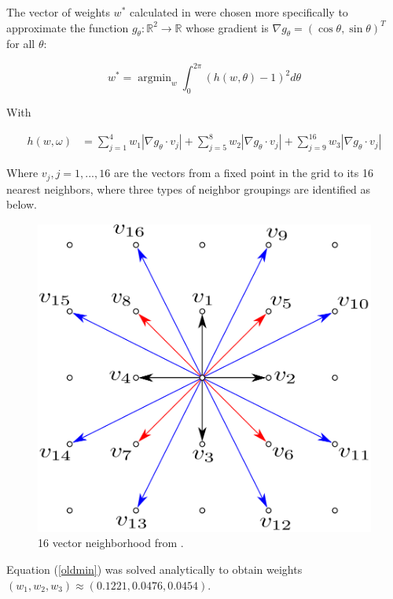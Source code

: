\documentclass[12pt]{article}
\DeclareMathOperator*{\argmin}{argmin}
\begin{document}
The vector of weights $w^*$ calculated in \cite{shapes} were chosen more specifically to approximate the function $g_\theta:\mathbb{R}^2 \to \mathbb{R}$ whose gradient is $\nabla g_\theta = (\cos \theta, \sin \theta)^T$ for all $\theta$:

\begin{equation} \label{oldmin}
w^* = \argmin_w \int_0^{2\pi} (h(w,\theta)-1)^2 d\theta
\end{equation}

With

\begin{align*}
h(w,\omega) &= \sum_{j=1}^4 w_1 |\nabla g_\theta \cdot v_j| + \sum_{j=5}^8 w_2 |\nabla g_\theta \cdot v_j| +  \sum_{j=9}^{16} w_3 |\nabla g_\theta \cdot v_j|
\end{align*}

Where $v_j, j= 1,...,16$ are the vectors from a fixed point in the grid to its 16 nearest neighbors, where three types of neighbor groupings are identified as below.

\begin{figure}[H]
\centering
\includegraphics[scale=0.25]{Figure_2_Vixie_Paper.png}
\caption{16 vector neighborhood from \cite{shapes}.}
\end{figure}

Equation (\ref{oldmin}) was solved analytically to obtain weights $(w_1,w_2,w_3) \approx (0.1221,0.0476,0.0454)$. 
\end{document}
